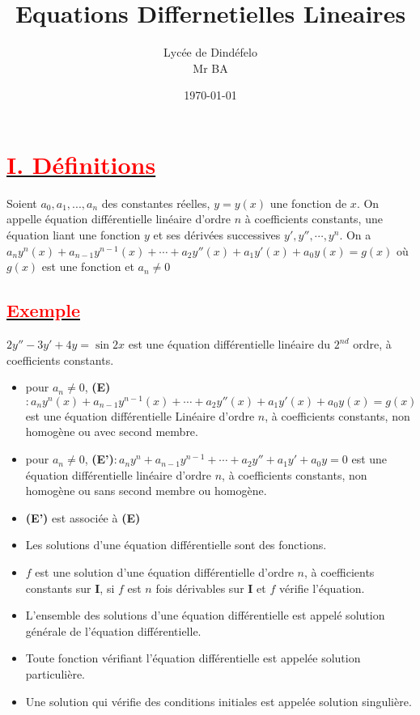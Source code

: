 \documentclass[12pt]{article}
\author{Lycée de Dindéfelo\\Mr BA}
\title{\textbf{Equations Differnetielles Lineaires}}
\date{\today}
\begin{document}
\maketitle
\newpage
\section*{\underline{\textbf{\textcolor{red}{I. Définitions}}}}
Soient $a_{0},a_{1},...,a_{n}$ des constantes réelles, $y=y(x)$ une fonction de 
$x$. On appelle équation différentielle linéaire d'ordre $n$ à coefficients constants, une équation liant une fonction $y$ et ses dérivées successives $y',y'',\cdots , y^{n}$. On a $a_{n}y^{n}(x)+a_{n-1}y^{n-1}(x)+\cdots +a_{2}y''(x)+a_{1}y'(x)+a_{0}y(x)=g(x)$ où $g(x)$ est une fonction et $a_{n}\neq 0$
\subsection*{\underline{\textbf{\textcolor{red}{Exemple}}}}
$2y''-3y'+4y=\sin 2x$ est une équation différentielle linéaire du $2^{nd}$ ordre, à coefficients constants.
\begin{itemize}
    \item pour $a_{n}\neq 0$, \textbf{(E)}$:a_{n}y^{n}(x)+a_{n-1}y^{n-1}(x)+\cdots+a_{2}y''(x)+a_{1}y'(x)+a_{0}y(x)=g(x)$ est une équation différentielle Linéaire d'ordre $n$, à coefficients constants, non homogène ou avec second membre. 
    \item pour $a_{n}\neq 0$, \textbf{(E')}$:a_{n}y^{n}+a_{n-1}y^{n-1}+\cdots+a_{2}y''+a_{1}y'+a_{0}y=0$ est une équation différentielle linéaire d'ordre $n$, à coefficients constants, non homogène ou sans second membre ou homogène. 	   
    \item \textbf{(E')} est associée à \textbf{(E)}
    \item  Les solutions d'une équation différentielle sont des fonctions.
    \item $f$ est une solution d'une équation différentielle d'ordre $n$, à coefficients constants sur \textbf{I}, si $f$ est $n$ fois dérivables sur \textbf{I} et $f$ vérifie l'équation.
    \item L'ensemble des solutions d'une équation différentielle est appelé solution générale de l'équation différentielle.
    \item Toute fonction vérifiant l'équation différentielle est appelée solution particulière.
    \item Une solution qui vérifie des conditions initiales est appelée solution singulière.
\end{itemize}
\end{document}
